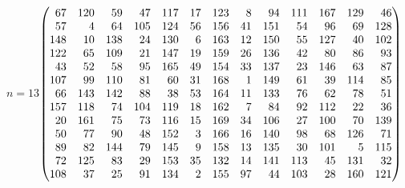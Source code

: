 {\noindent\hfill $n=13$\quad$\left(\begin{array}{@{}rrrrrrrrrrrrr@{}}67&120&59&47&117&17&123&8&94&111&167&129&46\\57&4&64&105&124&56&156&41&151&54&96&69&128\\148&10&138&24&130&6&163&12&150&55&127&40&102\\122&65&109&21&147&19&159&26&136&42&80&86&93\\43&52&58&95&165&49&154&33&137&23&146&63&87\\107&99&110&81&60&31&168&1&149&61&39&114&85\\66&143&142&88&38&53&164&11&133&76&62&78&51\\157&118&74&104&119&18&162&7&84&92&112&22&36\\20&161&75&73&116&15&169&34&106&27&100&70&139\\50&77&90&48&152&3&166&16&140&98&68&126&71\\89&82&144&79&145&9&158&13&135&30&101&5&115\\72&125&83&29&153&35&132&14&141&113&45&131&32\\108&37&25&91&134&2&155&97&44&103&28&160&121\end{array}\right)$\hfill\null\par\medskip
}

